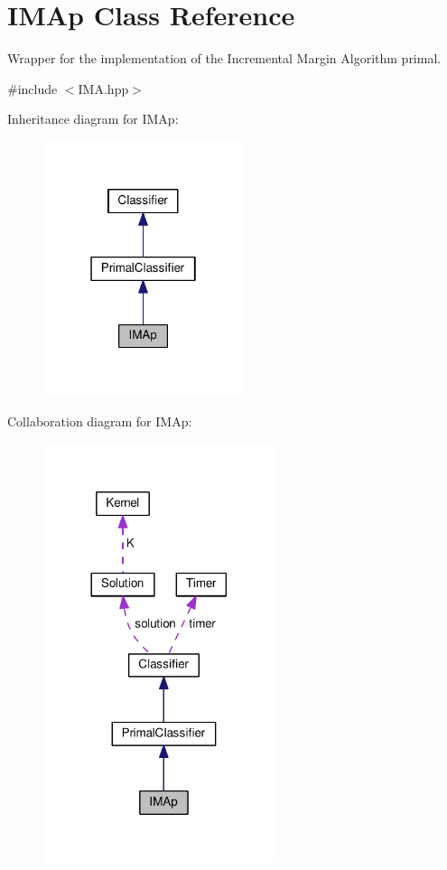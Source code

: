\hypertarget{class_i_m_ap}{}\section{I\+M\+Ap Class Reference}
\label{class_i_m_ap}


Wrapper for the implementation of the Incremental Margin Algorithm primal.  




{\ttfamily \#include $<$I\+M\+A.\+hpp$>$}



Inheritance diagram for I\+M\+Ap\+:\nopagebreak
\begin{figure}[H]
\begin{center}
\leavevmode
\includegraphics[width=166pt]{class_i_m_ap__inherit__graph}
\end{center}
\end{figure}


Collaboration diagram for I\+M\+Ap\+:
\nopagebreak
\begin{figure}[H]
\begin{center}
\leavevmode
\includegraphics[width=192pt]{class_i_m_ap__coll__graph}
\end{center}
\end{figure}
